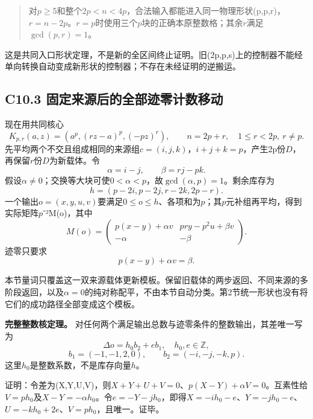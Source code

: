 \documentclass[11pt,a4paper]{article}
\theoremstyle{definition}
\numberwithin{equation}{section}
\begin{document}
\begin{quote}
{对\ensuremath{p}\ensuremath{\ge}5和整个\ensuremath{2p<n<4p}，合法输入都能进入同一物理形状(p,p,r)，\ensuremath{r=n-2p}。\ensuremath{r=p}时使用三个\ensuremath{p}块的正确本原整数格；其余\ensuremath{r}满足\ensuremath{\operatorname{gcd}(p,r)=1}。}
\end{quote}

{这是共同入口形状定理，不是新的全区间终止证明。旧(2p,p,s)上的控制器不能经单向转换自动变成新形状的控制器；不存在未经证明的逆搬运。}

\subsection*{\texorpdfstring{{C10.3} {固定来源后的全部迹零计数移动}}{C10.3 固定来源后的全部迹零计数移动}}\label{C10-h75}

{现在用共同核心} \[
K_{p,r}(a,z)=(a^p,(rz-a)^p,(-pz)^r),\qquad n=2p+r,
\quad 1\le r<2p,\ r\ne p.
\] {先平均两个不交且组成相同的来源组\ensuremath{c=(i,j,k)}，\ensuremath{i+j+k=p}，产生2p份\ensuremath{D}，再保留\ensuremath{r}份\ensuremath{D}为新载体。令} \[
\alpha=i-j,\qquad \beta=rj-pk.
\] {假设\ensuremath{\alpha }\ensuremath{\ne}0；交换等大块可使\ensuremath{0<\alpha <p}，故\ensuremath{\operatorname{gcd}(\alpha ,p)=1}。剩余库存为} \[
h=(p-2i,p-2j,r-2k,2p-r).
\tag{C10.3.1}
\] {一个输出\ensuremath{o=(x,y,u,v)}要满足0\ensuremath{\le}\ensuremath{o}\ensuremath{\le}\ensuremath{h}、各项和为\ensuremath{p}；其\ensuremath{p}元补组再平均，得到实际矩阵\ensuremath{p}⁻²M(o)，其中} \[
M(o)=\begin{pmatrix}
p(x-y)+\alpha v&pry-p^2u+\beta v\\
-\alpha&-\beta
\end{pmatrix}.
\tag{C10.3.2}
\] {迹零只要求} \[
p(x-y)+\alpha v=\beta.
\tag{C10.3.3}
\]

{本节量词只覆盖这一双来源载体更新模板。保留旧载体的两步返回、不同来源的多阶段返回，以及\ensuremath{\alpha =0}的纯对称配平，不由本节自动分类。第2节统一形状也没有将它们的成功路径全部变成这个模板。}

\textbf{{完整整数核定理。}} {对任何两个满足输出总数与迹零条件的整数输出，其差唯一写为} \[
\boxed{\Delta o=h_0b_2+e b_1,\quad h_0,e\in\mathbb Z,}
\] \[
\boxed{b_1=(-1,-1,2,0),\qquad b_2=(-i,-j,-k,p).}
\tag{C10.3.4}
\] {这里\ensuremath{h_{0}}是整数系数，不是库存向量\ensuremath{h}。}

{证明：令差为(X,Y,U,V)，则\ensuremath{X+Y+U+V=0}、\ensuremath{p(X-Y)+\alpha V=0}。互素性给\ensuremath{V=ph_{0}}及\ensuremath{X-Y=-\alpha h_{0}}。令\ensuremath{e=-Y-jh_{0}}，即得\ensuremath{X=-ih_{0}-e}、\ensuremath{Y=-jh_{0}-e}、\ensuremath{U=-kh_{0}+2e}、\ensuremath{V=ph_{0}}，且唯一。证毕。}
\end{document}
